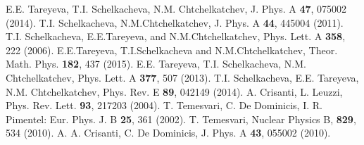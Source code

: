\documentclass{jetpl}
\begin{document}
\begin{thebibliography}{99}
E.E. Tareyeva, T.I. Schelkacheva, N.M. Chtchelkatchev,  J. Phys. A \textbf{47}, 075002 (2014).
 T.I. Schelkacheva, N.M.Chtchelkatchev, J. Phys. A \textbf{44}, 445004 (2011).
  T.I. Schelkacheva, E.E.Tareyeva, and N.M.Chtchelkatchev, {Phys. Lett. A} {\bf 358}, 222 (2006).
 E.E.Tareyeva, T.I.Schelkacheva and  N.M.Chtchelkatchev, Theor. Math. Phys. {\bf{182}}, 437 (2015).
 E.E. Tareyeva, T.I. Schelkacheva, N.M. Chtchelkatchev,  Phys. Lett. A \textbf{377}, 507 (2013).
T.I. Schelkacheva, E.E. Tareyeva, N.M. Chtchelkatchev, Phys. Rev. E \textbf{89}, 042149 (2014).
 A. Crisanti, L. Leuzzi, Phys. Rev. Lett. {\bf93}, 217203 (2004).
 T. Temesvari, C. De Dominicis, I. R.  Pimentel: Eur. Phys. J.
B  {\bf 25}, 361 (2002).
 T. Temesvari, Nuclear Physics B, {\bf  829}, 534 (2010).
A.	A. Crisanti, C. De Dominicis, J. Phys. A \textbf{43}, 055002 (2010).



\end{thebibliography}
\end{document}
